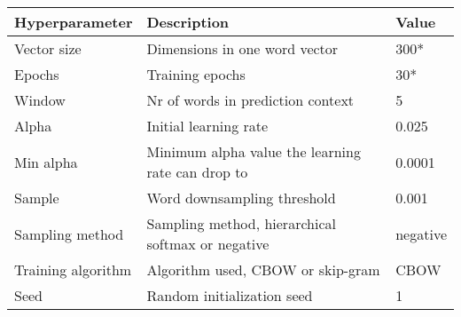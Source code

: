 \begin{tabular}{|l|p{70mm}|l|} \hline
\textbf{Hyperparameter} & \textbf{Description} & \textbf{Value} \\ \hline
Vector size & Dimensions in one word vector & 300* \\ \hline
Epochs & Training epochs & 30* \\ \hline
Window & Nr of words in prediction context & 5 \\ \hline
Alpha & Initial learning rate & 0.025 \\ \hline
Min alpha & Minimum alpha value the learning rate can drop to & 0.0001 \\ \hline
Sample & Word downsampling threshold & 0.001 \\ \hline
Sampling method & Sampling method, hierarchical softmax or negative & negative \\ \hline
Training algorithm & Algorithm used, CBOW or skip-gram & CBOW \\ \hline
Seed & Random initialization seed & 1 \\ \hline
\end{tabular}